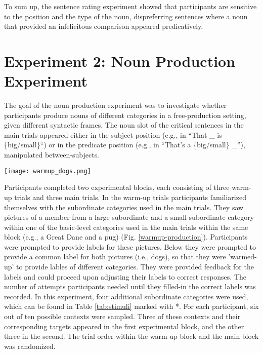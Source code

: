To sum up, the sentence rating experiment showed that participants are sensitive to the position and the type of the noun, dispreferring sentences where a noun that provided an infelicitous comparison appeared predicatively.  

\section{Experiment 2: Noun Production Experiment}    


The goal of the noun production experiment was to investigate whether participants produce nouns of different categories in a free-production setting, given different syntactic frames.  The noun slot of the critical sentences in the main trials appeared either in the subject position (e.g., in “That \_ is \{big/small\}“) or in the predicate position (e.g., in “That’s a \{big/small\} \_”), manipulated between-subjects. 

\begin{figure*}[t]
	\begin{center}
		\texttt{[image: warmup\_dogs.png]}
	\end{center}
	\caption{Example view of the noun production warm-up trial: Participants have to label a large-subordinate (Great Dane, right) and a small-subordinate target (pug, left) for the dogs-category.}
	\label{warmup-production}
\end{figure*}
Participants completed two experimental blocks, each consisting of three warm-up trials and three main trials. In the warm-up trials participants familiarized themselves with the subordinate categories used in the main trials. They saw pictures of a member from a large-subordinate and a small-subordinate category within one of the basic-level categories used in the main trials within the same block (e.g., a Great Dane and a pug) (Fig. \ref{warmup-production}). Participants were prompted to provide labels for these pictures. Below they were prompted to provide a common label for both pictures (i.e., dogs), so that they were 'warmed-up' to provide lables of different categories. They were provided feedback for the labels and could proceed upon adjusting their labels to correct responses. The number of attempts participants needed until they filled-in the correct labels was recorded. In this experiment, four additional subordinate categories were used, which can be found in Table \ref{tab:stimuli} marked with *. For each participant, six out of ten possible contexts were sampled. Three of these contexts and their corresponding targets appeared in the first experimental block, and the other three in the second. The trial order within the warm-up block and the main block was randomized. 

